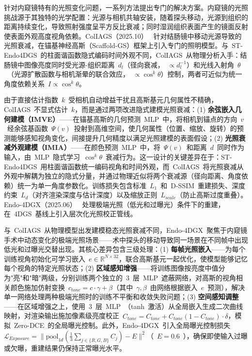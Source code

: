 针对内窥镜特有的光照变化问题，一系列方法提出专门的解决方案。内窥镜的光照挑战源于其独特的光学配置：光源与相机共轴安装，随着探头移动，光源到组织的距离持续变化，导致照射强度呈平方反比衰减；同时湿润组织表面产生的镜面反射使表面外观高度视角依赖。ColIAGS（2025.10）~\cite{2510_18739} 针对结肠镜中移动光源导致的光照衰减，在锚基神经高斯（Scaffold-GS）框架上引入专门的照明模型。与~ST-Endo4DGS~的柱面谐函数隐式编码时间外观不同，ColIAGS~从物理分析入手：结肠镜中图像亮度同时受光源-组织距离~$d_l$（径向衰减，~$\propto d_l^{-1}$）和光线入射角~$\theta$~（光源扩散函数与相机渐晕的联合效应，~$\propto \cos^k\theta$）控制，两者可近似为统一角度依赖关系~$I \propto \cos^k\theta$。

由于直接估计指数~$k$~受相机自动增益干扰且高斯基元几何属性不精确，ColIAGS~不显式估计~$k$，而是通过两项改进隐式建模光照衰减：(1) \textbf{余弦嵌入几何建模（IMVE）}——在锚基高斯的几何预测~MLP~中，将相机到锚点的方向~$v$~经余弦基函数~$\Psi(v)$~投射到高维空间，使几何属性（位置、缩放、旋转）的预测能够感知视角变化，间接提升几何精度以满足光照建模的表面假设；(2) \textbf{光照衰减外观建模（IMIA）}——在颜色预测~MLP~中，将~$\Psi(v)$~和距离~$d$~同时作为输入，由~MLP~隐式学习~$\cos^k\theta$~衰减行为。这一设计的关键差异在于：ST-Endo4DGS~用柱面谐函数统一编码视角和时间外观，而~ColIAGS~将光照衰减从外观中解耦为独立的隐式分量，并通过物理近似将两个衰减源（径向距离、角度依赖）统一为单一角度参数化。训练损失包含标准~$L_1$~和~D-SSIM~重建损失、深度约束~$L_d$（对齐渲染深度与估计深度）以及缩放正则~$L_{scale}$（防止高斯过度重叠）。Endo-4DGX（2025.06）~\cite{2506_23308} 处理极端光照（低光和过曝光）条件下的重建，在~4DGS~基线上引入层次化光照校正管线。

与~ColIAGS~从物理模型出发建模稳态光照衰减不同，Endo-4DGX~聚焦于内窥镜手术中动态变化的极端光照场景——术中探头的移动导致同一场景在不同帧中出现低光和过曝光交替出现。其核心差异包含三级处理：(1) \textbf{每帧光照嵌入}——为每个训练视角初始化可学习嵌入~$e \in \mathbb{R}^{N \times 32}$，联合高斯基元一起优化，使模型能够记忆每个视角的特定光照状态；(2) \textbf{区域感知增强}——将训练图像按亮度中值分为"亮"和"暗"两级，分别训练两个独立的~3~层~MLP~遮蔽网络，对高斯的视角相关颜色施加仿射变换~$c_{tone} = c \cdot \gamma + \beta$（其中~$\gamma, \beta$~由网络根据嵌入~$e$~预测），解决单一网络处理两种极端光照时的训练不平衡和收敛失败问题；(3) \textbf{空间感知调整}——在区域增强之上，使用~3~层~MLP~（tanh~激活）从全局嵌入生成二次曲线映射，对渲染输出施加像素级亮度校正~$\hat{C}_{tone} = C_{tone} + C_{tone}(1 - C_{tone}) \cdot \delta$，模拟~Zero-DCE~的全局曝光控制。此外，Endo-4DGX~引入全局曝光控制损失~$\mathcal{L}_{Exposure} = \|\text{pool}_{1d}(\frac{1}{3}\sum_{j \in \{R,G,B\}} C_j) - E\|^2$（~$E=0.6$~），确保即使输入过曝或欠曝，重建结果仍保持正常曝光水平。

